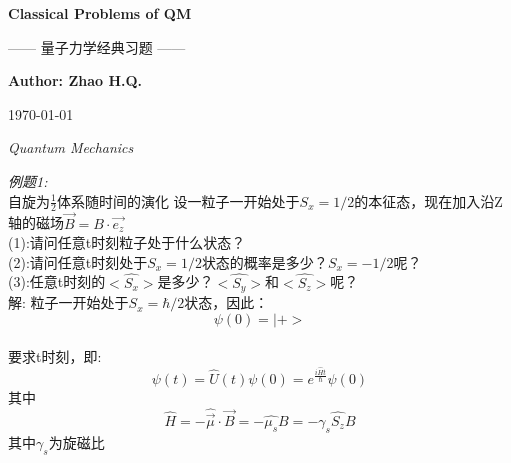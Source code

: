 \documentclass[UTF8]{ctexart}
\begin{document}
\begin{titlepage}
\centering


\vspace*{4cm}

{\Huge\bfseries Classical Problems of QM \par}

\vspace{1.5cm}

{\Large —— 量子力学经典习题 —— \par}

\vspace{3cm}

{\Large \textbf{Author: Zhao H.Q.} \par}

\vspace{0.5cm}

{\large \today \par}

\vfill

{\large \textit{Quantum Mechanics}}

\end{titlepage}

\clearpage









\emph{例题1:}\\
自旋为$\frac{1}{2}$体系随时间的演化
设一粒子一开始处于$S_x=1/2$的本征态，现在加入沿Z轴的磁场$\overrightarrow{B}=B\cdot \overrightarrow{e_z}$\\
(1):请问任意t时刻粒子处于什么状态？\\
(2):请问任意t时刻处于$S_x=1/2$状态的概率是多少？$S_x=-1/2$呢？\\
(3):任意t时刻的$<\hat{S_x}>$是多少？$\hat{<S_y>}$和$\hat{<S_z>}$呢？\\

解:
粒子一开始处于$S_x=\hbar/2$状态，因此：
\[\psi(0) = |+> \]\\
要求t时刻，即:
\[\psi(t) = \hat{U}(t) \psi(0) = e^{\frac{i\hat{H}t}{\hbar}} \psi(0) \]
其中
\[\hat{H} = -\hat{\overrightarrow{\mu}} \cdot \overrightarrow{B} = -\hat{\mu_s} B = -\gamma_s \hat{S_z} B\]
其中$\gamma_s$为旋磁比
\end{document}
